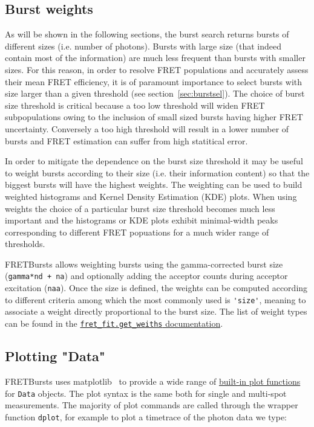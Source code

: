 \subsection{Burst weights}

As will be shown in the following sections, the burst search returns bursts of different sizes (i.e. number of photons). 
Bursts with large size (that indeed contain most of the information) 
are much less frequent than bursts with smaller sizes. For this reason, in order 
to resolve FRET populations and accurately assess their mean FRET efficiency, it is of
paramount importance to select bursts with size larger than a given threshold (see 
section~\ref{sec:burstsel}). The choice of burst size threshold is 
critical because a too low threshold will widen FRET subpopulations owing to the 
inclusion of small sized bursts having higher FRET uncertainty. Conversely 
a too high threshold will result in a lower number of bursts and FRET estimation 
can suffer from high statitical error.

In order to mitigate the dependence on the burst size threshold it may be 
useful to weight bursts according to their size (i.e. their 
information content) so that the biggest bursts will have the highest weights. 
The weighting can be used to build weighted histograms and Kernel Density Estimation (KDE) plots.
When using weights the choice of a particular burst size threshold becomes 
much less important and the histograms or KDE plots exhibit minimal-width
peaks corresponding to different FRET popuations for a much wider range
of thresholds. 

FRETBursts allows weighting bursts using the gamma-corrected burst size
(\verb|gamma*nd + na|) and optionally adding the acceptor counts during
acceptor excitation (\verb|naa|). Once the size is defined, the weights
can be computed according to different criteria among which the most
commonly used is \verb|'size'|, meaning to associate a weight 
directly proportional to the burst size. The list of weight types
can be found in the 
\href{http://fretbursts.readthedocs.org/en/latest/fret_fit.html#fretbursts.fret_fit.get_weights}{\texttt{fret\_fit.get\_weiths} documentation}.

\subsection{Plotting "Data"}

FRETBursts uses matplotlib~\cite{2096e2a4-8f50-4519-bfb3-f796da201630} to
provide a wide range of 
\href{http://fretbursts.readthedocs.org/en/latest/plots.html}{built-in plot functions}
for \verb|Data| objects. 
The plot syntax is the same both for single and multi-spot measurements. 
The majority of plot commands are called through the wrapper function 
\verb|dplot|, for example to plot a timetrace of the photon data we type:

